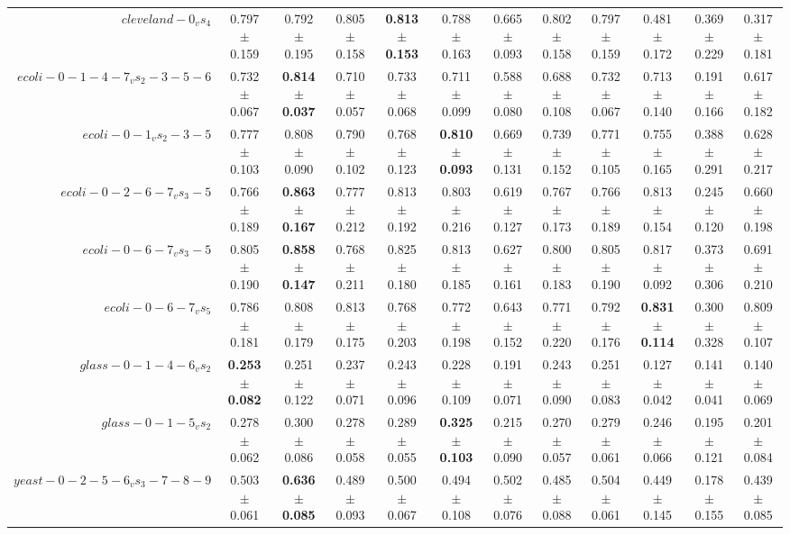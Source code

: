 \begin{table}[!ht]
{\begin{tabular}{r c c c c c c c c c c c}
$cleveland-0_vs_4$ & 0.797 $\pm$ 0.159 & 0.792 $\pm$ 0.195 & 0.805 $\pm$ 0.158 & \textbf{0.813 $\pm$ 0.153} & 0.788 $\pm$ 0.163 & 0.665 $\pm$ 0.093 & 0.802 $\pm$ 0.158 & 0.797 $\pm$ 0.159 & 0.481 $\pm$ 0.172 & 0.369 $\pm$ 0.229 & 0.317 $\pm$ 0.181 \\
$ecoli-0-1-4-7_vs_2-3-5-6$ & 0.732 $\pm$ 0.067 & \textbf{0.814 $\pm$ 0.037} & 0.710 $\pm$ 0.057 & 0.733 $\pm$ 0.068 & 0.711 $\pm$ 0.099 & 0.588 $\pm$ 0.080 & 0.688 $\pm$ 0.108 & 0.732 $\pm$ 0.067 & 0.713 $\pm$ 0.140 & 0.191 $\pm$ 0.166 & 0.617 $\pm$ 0.182 \\
$ecoli-0-1_vs_2-3-5$ & 0.777 $\pm$ 0.103 & 0.808 $\pm$ 0.090 & 0.790 $\pm$ 0.102 & 0.768 $\pm$ 0.123 & \textbf{0.810 $\pm$ 0.093} & 0.669 $\pm$ 0.131 & 0.739 $\pm$ 0.152 & 0.771 $\pm$ 0.105 & 0.755 $\pm$ 0.165 & 0.388 $\pm$ 0.291 & 0.628 $\pm$ 0.217 \\
$ecoli-0-2-6-7_vs_3-5$ & 0.766 $\pm$ 0.189 & \textbf{0.863 $\pm$ 0.167} & 0.777 $\pm$ 0.212 & 0.813 $\pm$ 0.192 & 0.803 $\pm$ 0.216 & 0.619 $\pm$ 0.127 & 0.767 $\pm$ 0.173 & 0.766 $\pm$ 0.189 & 0.813 $\pm$ 0.154 & 0.245 $\pm$ 0.120 & 0.660 $\pm$ 0.198 \\
$ecoli-0-6-7_vs_3-5$ & 0.805 $\pm$ 0.190 & \textbf{0.858 $\pm$ 0.147} & 0.768 $\pm$ 0.211 & 0.825 $\pm$ 0.180 & 0.813 $\pm$ 0.185 & 0.627 $\pm$ 0.161 & 0.800 $\pm$ 0.183 & 0.805 $\pm$ 0.190 & 0.817 $\pm$ 0.092 & 0.373 $\pm$ 0.306 & 0.691 $\pm$ 0.210 \\
$ecoli-0-6-7_vs_5$ & 0.786 $\pm$ 0.181 & 0.808 $\pm$ 0.179 & 0.813 $\pm$ 0.175 & 0.768 $\pm$ 0.203 & 0.772 $\pm$ 0.198 & 0.643 $\pm$ 0.152 & 0.771 $\pm$ 0.220 & 0.792 $\pm$ 0.176 & \textbf{0.831 $\pm$ 0.114} & 0.300 $\pm$ 0.328 & 0.809 $\pm$ 0.107 \\
$glass-0-1-4-6_vs_2$ & \textbf{0.253 $\pm$ 0.082} & 0.251 $\pm$ 0.122 & 0.237 $\pm$ 0.071 & 0.243 $\pm$ 0.096 & 0.228 $\pm$ 0.109 & 0.191 $\pm$ 0.071 & 0.243 $\pm$ 0.090 & 0.251 $\pm$ 0.083 & 0.127 $\pm$ 0.042 & 0.141 $\pm$ 0.041 & 0.140 $\pm$ 0.069 \\
$glass-0-1-5_vs_2$ & 0.278 $\pm$ 0.062 & 0.300 $\pm$ 0.086 & 0.278 $\pm$ 0.058 & 0.289 $\pm$ 0.055 & \textbf{0.325 $\pm$ 0.103} & 0.215 $\pm$ 0.090 & 0.270 $\pm$ 0.057 & 0.279 $\pm$ 0.061 & 0.246 $\pm$ 0.066 & 0.195 $\pm$ 0.121 & 0.201 $\pm$ 0.084 \\
$yeast-0-2-5-6_vs_3-7-8-9$ & 0.503 $\pm$ 0.061 & \textbf{0.636 $\pm$ 0.085} & 0.489 $\pm$ 0.093 & 0.500 $\pm$ 0.067 & 0.494 $\pm$ 0.108 & 0.502 $\pm$ 0.076 & 0.485 $\pm$ 0.088 & 0.504 $\pm$ 0.061 & 0.449 $\pm$ 0.145 & 0.178 $\pm$ 0.155 & 0.439 $\pm$ 0.085 \\

\end{tabular}}
\end{table}
